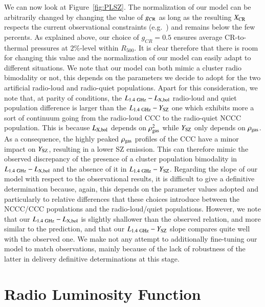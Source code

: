 \documentclass[traditabstract]{aa}
\newcommand{\rmn}{\mathrm}
\begin{document}
We can now look at Figure~\ref{fig:PLSZ}. The normalization of our model can be arbitrarily changed by changing the value of $g_{\rm{CR}}$ as long as the resulting $X_{\rm{CR}}$ respects the current observational constraints (e.g.~\citealp{2011arXiv1111.5544M}) and remains below the few percents. As explained above, our choice of $g_{CR}=0.5$ ensures average CR-to-thermal pressures at $2\%$-level within $R_{500}$. It is clear therefore that there is room for changing this value and the normalization of our model can easily adapt to different situations. We note that our model can both mimic a cluster radio bimodality or not, this depends on the parameters we decide to adopt for the two artificial radio-loud and radio-quiet populations. Apart for this consideration, we note that, at parity of conditions, the $L_{1.4~\rmn{GHz}}-L_{\rm{X,bol}}$ radio-loud and quiet population difference is larger than the $L_{1.4~\rmn{GHz}}-Y_{\rm{SZ}}$ one which exhibits more a sort of continuum going from the radio-loud CCC to the radio-quiet NCCC population. This is because $L_{\rm{X,bol}}$ depends on $\rho_{\rm{gas}}^2$ while $Y_{\rm{SZ}}$ only depends on $\rho_{\rm{gas}}$. As a consequence, the highly peaked $\rho_{\rm{gas}}$ profiles of the CCC have a minor impact on $Y_{\rm{SZ}}$, resulting in a lower SZ emission. This can therefore mimic the observed discrepancy of the presence of a cluster population bimodality  in $L_{1.4~\rmn{GHz}}-L_{\rm{X,bol}}$ and the absence of it in $L_{1.4~\rmn{GHz}}-Y_{\rm{SZ}}$. Regarding the slope of our model with respect to the observational results, it is difficult to give a definitive determination because, again, this depends on the parameter values adopted and particularly to relative differences that these choices introduce between the NCCC/CCC populations and the radio-loud/quiet populations. However, we note that our $L_{1.4~\rmn{GHz}}-L_{\rm{X,bol}}$ is slightly shallower than the observed relation, and more similar to the \cite{2009JCAP...09..024K} prediction, and that our $L_{1.4~\rmn{GHz}}-Y_{\rm{SZ}}$ slope compares quite well with the observed one. We make not any attempt to additionally fine-tuning our model to match observations, mainly because of the lack of robustness of the latter in delivery definitive determinations at this stage. 


\section{Radio Luminosity Function}
\label{sec:5}
\end{document}
